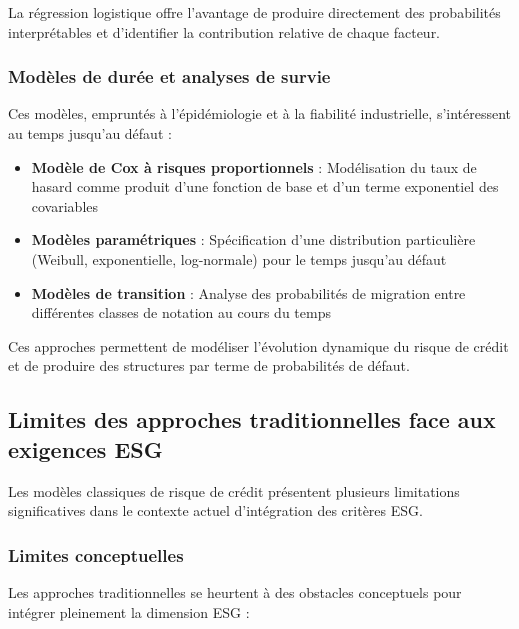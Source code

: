 La régression logistique offre l'avantage de produire directement des probabilités interprétables et d'identifier la contribution relative de chaque facteur.

\subsubsection{Modèles de durée et analyses de survie}

Ces modèles, empruntés à l'épidémiologie et à la fiabilité industrielle, s'intéressent au temps jusqu'au défaut :

\begin{itemize}
    \item \textbf{Modèle de Cox à risques proportionnels} : Modélisation du taux de hasard comme produit d'une fonction de base et d'un terme exponentiel des covariables
    
    \item \textbf{Modèles paramétriques} : Spécification d'une distribution particulière (Weibull, exponentielle, log-normale) pour le temps jusqu'au défaut
    
    \item \textbf{Modèles de transition} : Analyse des probabilités de migration entre différentes classes de notation au cours du temps
\end{itemize}

Ces approches permettent de modéliser l'évolution dynamique du risque de crédit et de produire des structures par terme de probabilités de défaut.

\subsection{Limites des approches traditionnelles face aux exigences ESG}

Les modèles classiques de risque de crédit présentent plusieurs limitations significatives dans le contexte actuel d'intégration des critères ESG.

\subsubsection{Limites conceptuelles}

Les approches traditionnelles se heurtent à des obstacles conceptuels pour intégrer pleinement la dimension ESG :

